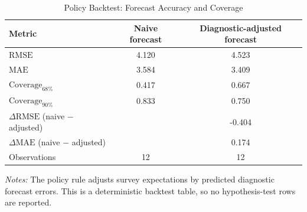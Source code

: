 \begin{table}[htbp]
\centering
\begin{threeparttable}
\caption{Policy Backtest: Forecast Accuracy and Coverage}
\label{tab:policy_backtest}
{\small
\begin{tabular}{lcc}
\toprule
Metric & Naive forecast & Diagnostic-adjusted forecast \\
\midrule
$\mathrm{RMSE}$ & 4.120 & 4.523 \\
$\mathrm{MAE}$ & 3.584 & 3.409 \\
$\mathrm{Coverage}_{68\%}$ & 0.417 & 0.667 \\
$\mathrm{Coverage}_{90\%}$ & 0.833 & 0.750 \\
\addlinespace
$\Delta\mathrm{RMSE}$ (naive $-$ adjusted) &  & -0.404 \\
$\Delta\mathrm{MAE}$ (naive $-$ adjusted) &  & 0.174 \\
Observations & 12 & 12 \\
\bottomrule
\end{tabular}
}
\begin{tablenotes}[flushleft]
\footnotesize
\item \textit{Notes:} The policy rule adjusts survey expectations by predicted diagnostic forecast errors. This is a deterministic backtest table, so no hypothesis-test rows are reported.
\end{tablenotes}
\end{threeparttable}
\end{table}
